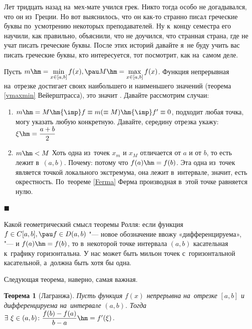 \documentclass[a4paper,10pt,twoside]{article}
\newtheorem{The}{Теорема}[section]
\newenvironment{Proof}
       {\par\noindent{\textbf{Доказательство.}}}
       {\hfill$\scriptstyle\blacksquare$}
\begin{document}
Лет тридцать назад на~мех-мате учился грек. Никто тогда особо не догадывался, что он из~Греции. Но вот выяснилось, что он как-то странно писал греческие
буквы по~усмотрению некоторых преподавателей. Ну к~концу семестра его научили, как правильно, объяснили, что не доучился, что странная страна, где
не учат писать греческие буквы. После этих историй давайте я~не буду учить вас писать греческие буквы, кто интересуется, тот посмотрит, как на~самом деле.

\begin{Proof}
    Пусть $m\hm=\min\limits_{x\in[a,b]}f(x),\pau M\hm=\max\limits_{x\in[a,b]}f(x)$. Функция непрерывная на~отрезке достигает своих наибольшего и наименьшего значений (теорема \ref{vmaxmin} Вейерштрасса), это значит
    . Давайте рассмотрим случаи:

    \begin{enumerate}
        \item $m\hm=M\hm{\imp} f\equiv m(\equiv M)\hm{\imp} f'\equiv0$, подходит любая точка, могу указать любую конкретную. Давайте, середину отрезка укажу:
        $\xi\hm=\dfrac{a+b}2$

        \item $m\hm<M$ Хоть одна из~точек $x_m$ и $x_M$ отличается от $a$ и от $b$, то есть лежит в~$(a,b)$.
        Почему: потому что $f(a)\hm=f(b)$. Эта одна из~точек
        является точкой локального экстремума, она лежит в~интервале, значит, есть окрестность. По~теореме \ref{Ferma} Ферма производная в~этой точке равняется нулю.
    \end{enumerate}
\end{Proof}

Какой геометрический смысл теоремы Ролля: если функция $f\in C[a,b],\pau f\in D(a,b)$ "--- новое обозначение ввожу «дифференцируема», "---
и $f(a)\hm=f(b)$, то в~некоторой точке интервала $(a,b)$ касательная к~графику горизонтальна. У нас может быть мильон точек с~горизонтальной касательной, а~должна быть хотя бы одна.

Следующая теорема, наверно, самая важная.

\begin{The}[Лагранжа]\label{Lag}
    Пусть функция $f(x)$ непрерывна на~отрезке $[a,b]$ и дифференцируема на~интервале $(a,b)$. Тогда $\exists\  \xi\in(a,b)\colon \dfrac{f(b)-f(a)}{b-a}\hm=f'(\xi)$.
\end{The}
\end{document}
